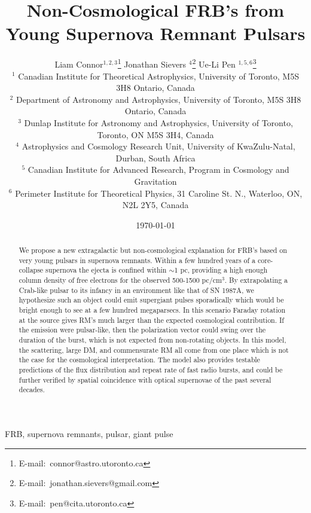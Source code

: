 \documentclass[useAMS,usenatbib]{mn2e}
\title{Non-Cosmological FRB's from Young Supernova Remnant Pulsars}
\author[Connor et al.]{
Liam Connor$^{1,2,3}$\thanks{E-mail:\ connor@astro.utoronto.ca}
Jonathan Sievers $^{4}$\thanks{E-mail:\ jonathan.sievers@gmail.com}
Ue-Li Pen $^{1, 5,6}$\thanks{E-mail:\ pen@cita.utoronto.ca}
\\
$^1$ Canadian Institute for Theoretical Astrophysics, University of Toronto, M5S 3H8 Ontario, Canada
\\
$^2$ Department of Astronomy and Astrophysics, University of Toronto, 
M5S 3H8 Ontario, Canada
\\
$^3$ Dunlap Institute for Astronomy and Astrophysics, University of Toronto,
Toronto, ON M5S 3H4, Canada
\\
$^4$ Astrophysics and Cosmology Research Unit, University of KwaZulu-Natal, Durban, South Africa
\\
$^5$ Canadian Institute for Advanced Research, Program in Cosmology
and Gravitation
\\
$^6$ Perimeter Institute for Theoretical Physics, 31 Caroline St. N., Waterloo, ON, N2L 2Y5, Canada
}
\begin{document}
\date{\today}
\pagerange{\pageref{firstpage}--\pageref{lastpage}} 
\maketitle
\label{firstpage}


\begin{abstract}

We  propose a new extragalactic but non-cosmological explanation for FRB's based on
very young pulsars in supernova remnants. Within a few hundred years of a 
core-collapse supernova the ejecta 
is confined within $\sim$1 pc, providing a high enough column density of free electrons 
for the observed 500-1500 pc/cm$^3$. By extrapolating a Crab-like pulsar to 
its infancy in an environment like that of SN 1987A, 
we hypothesize such an object could emit supergiant pulses sporadically which 
would be bright enough to see at a few hundred megaparsecs. In this scenario Faraday
rotation at the source gives RM's much larger than the expected
cosmological contribution.  If the emission were pulsar-like, then the polarization  %
vector could swing over the duration of the burst, which is not expected from 
non-rotating objects.
In this model, the scattering,
large DM, and commensurate RM all come from one place 
 which is not the case for the cosmological
interpretation.  The model also provides
testable predictions of the flux distribution and repeat rate of fast radio bursts, and could be further
verified by spatial coincidence with optical supernovae of the past several decades. 
\end{abstract}
\begin{keywords}
FRB, supernova remnants, pulsar, giant pulse
\end{keywords}

\end{document}
